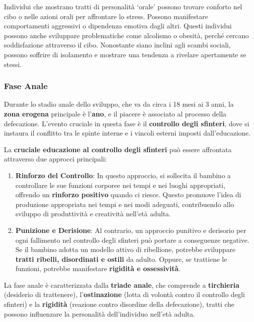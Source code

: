 \documentclass{subfiles}
\begin{document}
Individui che mostrano tratti di personalità `orale' possono trovare conforto nel cibo o nelle 
azioni orali per affrontare lo stress. Possono manifestare comportamenti aggressivi o dipendenza 
emotiva dagli altri. Questi individui possono anche sviluppare problematiche come alcolismo o 
obesità, perché cercano soddisfazione attraverso il cibo.
Nonostante siano inclini agli scambi sociali, possono soffrire di isolamento e mostrare una 
tendenza a rivelare apertamente se stessi.\\
    
\subsubsection{Fase Anale}
Durante lo stadio anale dello sviluppo, che va da circa i 18 mesi ai 3 anni, la 
\textbf{zona erogena} principale è l'\textbf{ano}, e il piacere è associato al processo della 
defecazione. 
L'evento cruciale in questa fase è il \textbf{controllo degli sfinteri}, dove si instaura il 
conflitto tra le spinte interne e i vincoli esterni imposti dall'educazione.

La \textbf{cruciale educazione al controllo degli sfinteri} può essere affrontata attraverso 
due approcci principali: 

\begin{enumerate}

    \item \textbf{Rinforzo del Controllo}: In questo approccio, si sollecita il bambino a 
    controllare le sue funzioni corporee nei tempi e nei luoghi appropriati, offrendo un 
    \textbf{rinforzo positivo} quando ci riesce. 
    Questo promuove l'idea di produzione appropriata nei tempi e nei modi adeguati, contribuendo 
    allo sviluppo di produttività e creatività nell'età adulta.

    \item \textbf{Punizione e Derisione}: Al contrario, un approccio punitivo e derisorio per 
    ogni fallimento nel controllo degli sfinteri può portare a conseguenze negative. 
    Se il bambino adotta un modello attivo di ribellione, potrebbe sviluppare 
    \textbf{tratti ribelli, disordinati e ostili} da adulto. Oppure, se trattiene le 
    funzioni, potrebbe manifestare \textbf{rigidità e ossessività}.

\end{enumerate}

La fase anale è caratterizzata dalla \textbf{triade anale}, che comprende a 
\textbf{tirchieria} (desiderio di trattenere), l'\textbf{ostinazione} 
(lotta di volontà contro il controllo degli sfinteri) e la \textbf{rigidità} 
(reazione contro disordine della defecazione), tratti che possono influenzare la personalità 
dell'individuo nell'età adulta.\\
\end{document}
